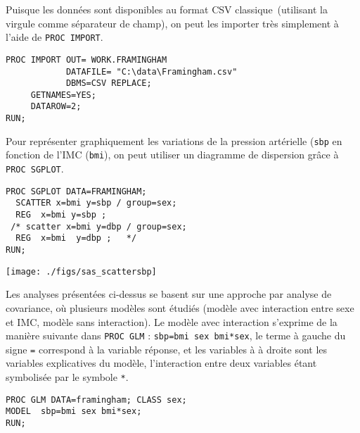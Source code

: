 \soln{\ref{exo:10.3}}
Puisque les données sont disponibles au format CSV \og classique\fg\
(utilisant la virgule comme séparateur de champ), on peut les importer très
simplement à l'aide de \texttt{PROC IMPORT}.
\begin{verbatim}
PROC IMPORT OUT= WORK.FRAMINGHAM
            DATAFILE= "C:\data\Framingham.csv"
            DBMS=CSV REPLACE;
     GETNAMES=YES;
     DATAROW=2;
RUN;
\end{verbatim}


Pour représenter graphiquement les variations de la pression artérielle
(\texttt{sbp} en fonction de l'IMC (\texttt{bmi}), on peut utiliser un
diagramme de dispersion grâce à \texttt{PROC SGPLOT}.
\begin{verbatim}
PROC SGPLOT DATA=FRAMINGHAM;
  SCATTER x=bmi y=sbp / group=sex;
  REG  x=bmi y=sbp ;
 /* scatter x=bmi y=dbp / group=sex;
  REG  x=bmi  y=dbp ;   */
RUN;
\end{verbatim}

\texttt{[image: ./figs/sas\_scattersbp]}

Les analyses présentées ci-dessus se basent sur une approche par analyse de
covariance, où plusieurs modèles sont étudiés (modèle avec interaction entre
sexe et IMC, modèle sans interaction). Le modèle avec interaction s'exprime
de la manière suivante dans \texttt{PROC GLM} : \verb|sbp=bmi sex bmi*sex|,
le terme à gauche du signe \texttt{=} correspond à la variable réponse, et
les variables à à droite sont les variables explicatives du modèle,
l'interaction entre deux variables étant symbolisée par le symbole
\texttt{*}.
\begin{verbatim}
PROC GLM DATA=framingham; CLASS sex;
MODEL  sbp=bmi sex bmi*sex;
RUN;
\end{verbatim}

